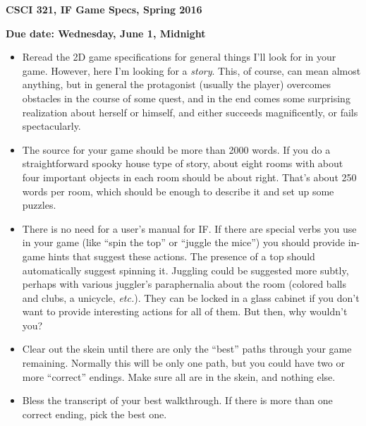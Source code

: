 \documentclass{article}
\begin{document}
\centerline{\large\bf CSCI 321, IF Game Specs, Spring 2016}
\centerline{\bf Due date: Wednesday, June 1, Midnight}

\begin{itemize}
  \item
Reread the 2D game specifications for general things I'll look for in
your game.  However, here I'm looking for a \textit{story}.  This, of
course, can mean almost anything, but in general the protagonist
(usually the player) overcomes obstacles in the course of some quest,
and in the end comes some surprising realization about herself or
himself, and either succeeds magnificently, or fails spectacularly. 

\item The source for your game should be more than 2000 words.  If you
  do a straightforward  spooky house type of story, about eight
  rooms with about four important objects in each room should be about
  right.  That's about 250 words per room, which should be enough to
  describe it and set up some puzzles.

\item There is no need for a user's manual for IF.  If there are
  special verbs you use in your game (like  ``spin the top'' or
  ``juggle the mice'') you should provide in-game hints that suggest
  these actions.  The presence of a top should automatically suggest
  spinning it.  Juggling could be suggested more subtly, perhaps with
  various juggler's paraphernalia about the room (colored balls and
  clubs, a unicycle, \textit{etc.}).  They can be locked in a glass
  cabinet if you don't want to provide interesting actions for all of
  them.  But then, why wouldn't you?

\item Clear out the skein until there are only the ``best'' paths
  through your game remaining.  Normally this will be only one path,
  but you could have two or more ``correct'' endings.  Make sure all
  are in the skein, and nothing else.

\item Bless the transcript of your best walkthrough.  If there is
  more than one correct ending, pick the best one.

\end{itemize}

  
\end{document}
